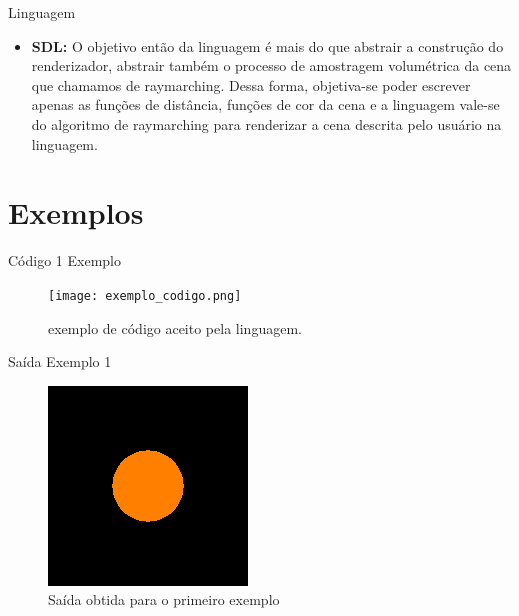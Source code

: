 \documentclass[2pt]{beamer} %
\begin{document}
\begin{frame}{Linguagem}
\begin{itemize}
\item \textbf{SDL:} O objetivo então da linguagem é mais do que abstrair a construção do renderizador, abstrair também o processo de amostragem volumétrica da cena que chamamos de raymarching. Dessa forma, objetiva-se poder escrever apenas as funções de distância, funções de cor da cena e a linguagem vale-se do algoritmo de raymarching para renderizar a cena descrita pelo usuário na linguagem.
\end{itemize}
\end{frame}




\section{Exemplos}

\begin{frame}{Código 1 Exemplo}


\begin{figure}
    \centering
    \texttt{[image: exemplo\_codigo.png]}
    \caption{exemplo de código aceito pela linguagem.}
    \label{fig:enter-label}
\end{figure}
\end{frame}




\begin{frame}{Saída Exemplo 1}


\begin{figure}
    \centering
    \includegraphics[width=0.5\linewidth]{imgs/ex1.png}
    \caption{Saída obtida para o primeiro exemplo}
    \label{fig:enter-label}
\end{figure}

\end{frame}
\end{document}
